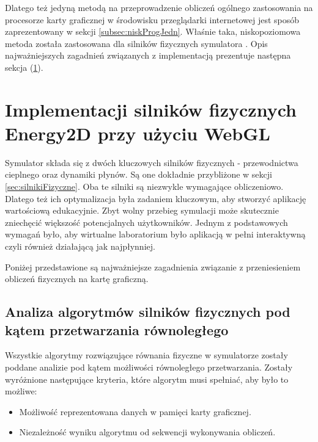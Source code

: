 Dlatego też jedyną metodą na przeprowadzenie obliczeń ogólnego zastosowania na
procesorze karty graficznej w środowisku przeglądarki internetowej jest sposób
zaprezentowany w sekcji \ref{subsec:niskProgJedn}. Właśnie taka, niskopoziomowa
metoda została zastosowana dla silników fizycznych symulatora .
Opis najważniejszych zagadnień związanych z implementacją prezentuje następna
sekcja (\ref{sec:implSilFizWebGL}).

\section{Implementacji silników fizycznych Energy2D przy użyciu WebGL}
\label{sec:implSilFizWebGL}

Symulator  składa się z dwóch kluczowych silników fizycznych -
przewodnictwa cieplnego oraz dynamiki płynów. Są one dokładnie przybliżone w
sekcji \ref{sec:silnikiFizyczne}. Oba te silniki są niezwykle wymagające
obliczeniowo. Dlatego też ich optymalizacja była zadaniem kluczowym, aby
stworzyć aplikację wartościową edukacyjnie. Zbyt wolny przebieg symulacji może
skutecznie zniechęcić większość potencjalnych użytkowników. Jednym z
podstawowych wymagań było, aby wirtualne laboratorium było aplikacją w pełni
interaktywną czyli również działającą jak najpłynniej.

Poniżej przedstawione są najważniejsze zagadnienia związanie z przeniesieniem
obliczeń fizycznych  na kartę graficzną.

\subsection{Analiza algorytmów silników fizycznych pod kątem przetwarzania
równoległego}  

Wszystkie algorytmy rozwiązujące równania fizyczne w symulatorze 
zostały poddane analizie pod kątem możliwości równoległego przetwarzania.
Zostały wyróżnione następujące kryteria, które algorytm musi spełniać, aby było
to możliwe:

\begin{itemize}

\item Możliwość reprezentowana danych w pamięci karty graficznej.

\item Niezależność wyniku algorytmu od sekwencji wykonywania obliczeń.

\end{itemize}

